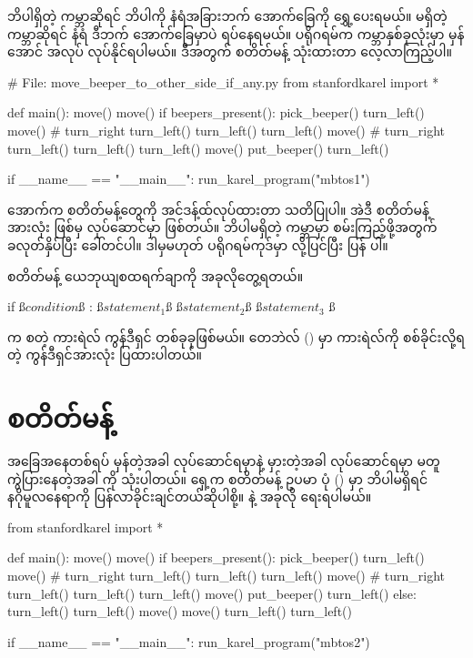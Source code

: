 %
ဘိပါရှိတဲ့ ကမ္ဘာဆိုရင် ဘိပါကို နံရံအခြားဘက် အောက်ခြေကို ရွှေ့ပေးရမယ်။ မရှိတဲ့ကမ္ဘာဆိုရင် နံရံ ဒီဘက် အောက်ခြေမှာပဲ ရပ်နေရမယ်။ ပရိုဂရမ်က ကမ္ဘာနှစ်ခုလုံးမှာ မှန်အောင် အလုပ် လုပ်နိုင်ရပါမယ်။ ဒီအတွက်  စတိတ်မန့် သုံးထားတာ လေ့လာကြည့်ပါ။ 
%
\begin{py}
# File: move_beeper_to_other_side_if_any.py
from stanfordkarel import *


def main():
    move()
    move()
    if beepers_present():
        pick_beeper()
        turn_left()
        move()
        # turn_right
        turn_left()
        turn_left()
        turn_left()
        move()
        # turn_right
        turn_left()
        turn_left()
        turn_left()
        move()
        put_beeper()
        turn_left()


if __name__ == "__main__":
    run_karel_program("mbtos1")

\end{py}
%
 အောက်က စတိတ်မန့်တွေကို အင်ဒန့်ထ်လုပ်ထားတာ သတိပြုပါ။ အဲဒီ စတိတ်မန့်အားလုံး  ဖြစ်မှ လုပ်ဆောင်မှာ ဖြစ်တယ်။ ဘိပါမရှိတဲ့ ကမ္ဘာမှာ စမ်းကြည့်ဖို့အတွက်  ခလုတ်နှိပ်ပြီး ခေါ်တင်ပါ။  ဒါမှမဟုတ် ပရိုဂရမ်ကုဒ်မှာ  လို့ပြင်ပြီး ပြန်  ပါ။  

 စတိတ်မန့် ယေဘုယျစထရက်ချာကို အခုလိုတွေ့ရတယ်။
%
\begin{py}
if ß$condition$ß :
    ß$statement_1$ß
    ß$statement_2$ß
    ß$statement_3$ ß
\end{py}
%
 က \fEn{,}  စတဲ့ ကားရဲလ် ကွန်ဒီရှင် တစ်ခုခုဖြစ်မယ်။ တေဘဲလ် (\fRefNo{\ref{tbl:karel_conditions}}) မှာ ကားရဲလ်ကို စစ်ခိုင်းလို့ရတဲ့ ကွန်ဒီရှင်အားလုံး ပြထားပါတယ်။


\section{ စတိတ်မန့်}
အခြေအနေတစ်ရပ် မှန်တဲ့အခါ လုပ်ဆောင်ရမှာနဲ့ မှားတဲ့အခါ လုပ်ဆောင်ရမှာ မတူကွဲပြားနေတဲ့အခါ  ကို သုံးပါတယ်။ ရှေ့က  စတိတ်မန့် ဥပမာ ပုံ (\fRefNo{\ref{fig:mbtos_if_any}})  မှာ ဘိပါမရှိရင် နဂိုမူလနေရာကို ပြန်လာခိုင်းချင်တယ်ဆိုပါစို့။  နဲ့ အခုလို ရေးရပါမယ်။
%
\begin{py}
from stanfordkarel import *


def main():
    move()
    move()
    if beepers_present():
        pick_beeper()
        turn_left()
        move()
        # turn_right
        turn_left()
        turn_left()
        turn_left()
        move()
        # turn_right
        turn_left()
        turn_left()
        turn_left()
        move()
        put_beeper()
        turn_left()
    else:
        turn_left()
        turn_left()
        move()
        move()
        turn_left()
        turn_left()


if __name__ == "__main__":
    run_karel_program("mbtos2")
\end{py}
%


